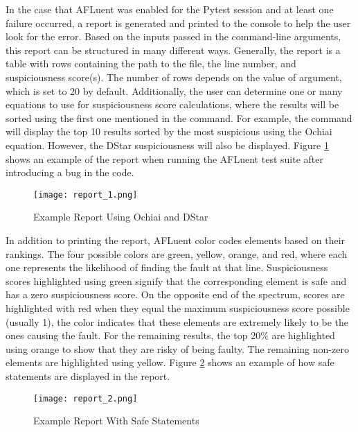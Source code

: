 In the case that AFLuent was enabled for the Pytest session and at least one
failure occurred, a report is generated and printed to the console to help the
user look for the error. Based on the inputs passed in the command-line
arguments, this report can be structured in many different ways. Generally, the
report is a table with rows containing the path to the file, the line number,
and suspiciousness score(s). The number of rows depends on the value of
 argument, which is set to 20 by default. Additionally, the
user can determine one or many equations to use for suspiciousness score
calculations, where the results will be sorted using the first one mentioned in
the command. For example, the command  will display the top 10 results
sorted by the most suspicious using the Ochiai equation. However, the
DStar suspiciousness will also be displayed. Figure \ref{fig:report_1} shows an
example of the report when running the AFLuent test suite after introducing a
bug in the code.

\begin{figure}[!htb]
	\begin{center}
		\texttt{[image: report\_1.png]}
		\caption{\label{fig:report_1} Example Report Using Ochiai and DStar}
	\end{center}
\end{figure}

In addition to printing the report, AFLuent color codes elements based on their
rankings. The four possible colors are green, yellow, orange, and red, where
each one represents the likelihood of finding the fault at that line.
Suspiciousness scores highlighted using green signify that the corresponding
element is safe and has a zero suspiciousness score. On the opposite end of the
spectrum, scores are highlighted with red when they equal the maximum
suspiciousness score possible (usually 1), the color indicates that these
elements are extremely likely to be the ones causing the fault. For the
remaining results, the top 20\% are highlighted using orange to show that they
are risky of being faulty. The remaining non-zero elements are highlighted using
yellow. Figure \ref{fig:report_2} shows an example of how safe statements are
displayed in the report.

\begin{figure}[!htb]
	\begin{center}
		\texttt{[image: report\_2.png]}
		\caption{\label{fig:report_2} Example Report With Safe Statements}
	\end{center}
\end{figure}

